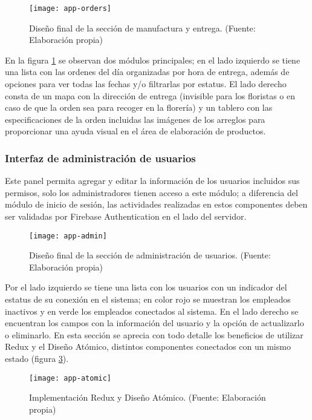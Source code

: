 \begin{figure}[H]
  \centering
  \texttt{[image: app-orders]}
  \caption{Diseño final de la sección de manufactura y entrega. (Fuente: Elaboración propia)}
  \label{production-ui}
\end{figure}

En la figura \ref{production-ui} se observan dos módulos principales; en el lado izquierdo se tiene una lista con las ordenes del día organizadas por hora de entrega, además de opciones para ver todas las fechas y/o filtrarlas por estatus. El lado derecho consta de un mapa con la dirección de entrega (invisible para los floristas o en caso de que la orden sea para recoger en la florería) y un tablero con las especificaciones de la orden incluidas las imágenes de los arreglos para proporcionar una ayuda visual en el área de elaboración de productos.
\vspace{0.8cm}

\subsubsection{Interfaz de administración de usuarios}
Este panel permita agregar y editar la información de los usuarios incluidos sus permisos, solo los administradores tienen acceso a este módulo; a diferencia del módulo de inicio de sesión, las actividades realizadas en estos componentes deben ser validadas por Firebase Authentication en el lado del servidor.
\vspace{0.8cm}

\begin{figure}[H]
  \centering
  \texttt{[image: app-admin]}
  \caption{Diseño final de la sección de administración de usuarios. (Fuente: Elaboración propia)}
  \label{admin-ui}
\end{figure}

Por el lado izquierdo se tiene una lista con los usuarios con un indicador del estatus de su conexión en el sistema; en color rojo se muestran los empleados inactivos y en verde los empleados conectados al sistema. En el lado derecho se encuentran los campos con la información del usuario y la opción de actualizarlo o eliminarlo. En esta sección se aprecia con todo detalle los beneficios de utilizar Redux y el Diseño Atómico, distintos componentes conectados con un mismo estado (figura \ref{admin-atomic}).
\vspace{0.8cm}

\begin{figure}[H]
  \centering
  \texttt{[image: app-atomic]}
  \caption{Implementación Redux y Diseño Atómico. (Fuente: Elaboración propia)}
  \label{admin-atomic}
\end{figure}

